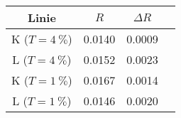 \begin{tabular}{cSSS}
\toprule
Linie  & {$R$}      & ${\Delta R}$ \\
\midrule
K ($T = \SI{4}{\percent}$) & 0.0140 & 0.0009 \\
L ($T = \SI{4}{\percent}$) & 0.0152 & 0.0023 \\
K ($T = \SI{1}{\percent}$) & 0.0167 & 0.0014 \\
L ($T = \SI{1}{\percent}$) & 0.0146 & 0.0020 \\
\bottomrule
\end{tabular}